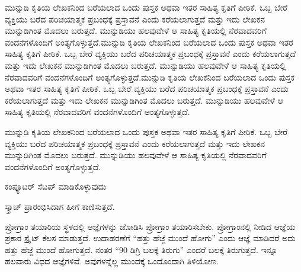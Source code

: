 \documentclass[16pt]{book}
\begin{document}
ಮುನ್ನುಡಿ ಕೃತಿಯ ಲೇಖಕನಿಂದ ಬರೆಯಲಾದ ಒಂದು ಪುಸ್ತಕ ಅಥವಾ ಇತರ ಸಾಹಿತ್ಯ ಕೃತಿಗೆ ಪೀಠಿಕೆ. ಒಬ್ಬ ಬೇರೆ ವ್ಯಕ್ತಿಯು ಬರೆದ ಪರಿಚಯಾತ್ಮಕ ಪ್ರಬಂಧಕ್ಕೆ ಪ್ರಸ್ತಾವನೆ ಎಂದು ಕರೆಯಲಾಗುತ್ತದೆ ಮತ್ತು ಇದು ಲೇಖಕನ ಮುನ್ನುಡಿಗಿಂತ ಮೊದಲು ಬರುತ್ತದೆ. ಮುನ್ನುಡಿಯು ಹಲವುವೇಳೆ ಆ ಸಾಹಿತ್ಯ ಕೃತಿಯಲ್ಲಿ ನೆರವಾದವರಿಗೆ ವಂದನೆಗಳೊಂದಿಗೆ ಅಂತ್ಯಗೊಳ್ಳುತ್ತದೆ.ಮುನ್ನುಡಿ ಕೃತಿಯ ಲೇಖಕನಿಂದ ಬರೆಯಲಾದ ಒಂದು ಪುಸ್ತಕ ಅಥವಾ ಇತರ ಸಾಹಿತ್ಯ ಕೃತಿಗೆ ಪೀಠಿಕೆ. ಒಬ್ಬ ಬೇರೆ ವ್ಯಕ್ತಿಯು ಬರೆದ ಪರಿಚಯಾತ್ಮಕ ಪ್ರಬಂಧಕ್ಕೆ ಪ್ರಸ್ತಾವನೆ ಎಂದು ಕರೆಯಲಾಗುತ್ತದೆ ಮತ್ತು ಇದು ಲೇಖಕನ ಮುನ್ನುಡಿಗಿಂತ ಮೊದಲು ಬರುತ್ತದೆ. ಮುನ್ನುಡಿಯು ಹಲವುವೇಳೆ ಆ ಸಾಹಿತ್ಯ ಕೃತಿಯಲ್ಲಿ ನೆರವಾದವರಿಗೆ ವಂದನೆಗಳೊಂದಿಗೆ ಅಂತ್ಯಗೊಳ್ಳುತ್ತದೆ.ಮುನ್ನುಡಿ ಕೃತಿಯ ಲೇಖಕನಿಂದ ಬರೆಯಲಾದ ಒಂದು ಪುಸ್ತಕ ಅಥವಾ ಇತರ ಸಾಹಿತ್ಯ ಕೃತಿಗೆ ಪೀಠಿಕೆ. ಒಬ್ಬ ಬೇರೆ ವ್ಯಕ್ತಿಯು ಬರೆದ ಪರಿಚಯಾತ್ಮಕ ಪ್ರಬಂಧಕ್ಕೆ ಪ್ರಸ್ತಾವನೆ ಎಂದು ಕರೆಯಲಾಗುತ್ತದೆ ಮತ್ತು ಇದು ಲೇಖಕನ ಮುನ್ನುಡಿಗಿಂತ ಮೊದಲು ಬರುತ್ತದೆ. ಮುನ್ನುಡಿಯು ಹಲವುವೇಳೆ ಆ ಸಾಹಿತ್ಯ ಕೃತಿಯಲ್ಲಿ ನೆರವಾದವರಿಗೆ ವಂದನೆಗಳೊಂದಿಗೆ ಅಂತ್ಯಗೊಳ್ಳುತ್ತದೆ.

\vspace{1cm}
ಮುನ್ನುಡಿ ಕೃತಿಯ ಲೇಖಕನಿಂದ ಬರೆಯಲಾದ ಒಂದು ಪುಸ್ತಕ ಅಥವಾ ಇತರ ಸಾಹಿತ್ಯ ಕೃತಿಗೆ ಪೀಠಿಕೆ. ಒಬ್ಬ ಬೇರೆ ವ್ಯಕ್ತಿಯು ಬರೆದ ಪರಿಚಯಾತ್ಮಕ ಪ್ರಬಂಧಕ್ಕೆ ಪ್ರಸ್ತಾವನೆ ಎಂದು ಕರೆಯಲಾಗುತ್ತದೆ ಮತ್ತು ಇದು ಲೇಖಕನ ಮುನ್ನುಡಿಗಿಂತ ಮೊದಲು ಬರುತ್ತದೆ. ಮುನ್ನುಡಿಯು ಹಲವುವೇಳೆ ಆ ಸಾಹಿತ್ಯ ಕೃತಿಯಲ್ಲಿ ನೆರವಾದವರಿಗೆ ವಂದನೆಗಳೊಂದಿಗೆ ಅಂತ್ಯಗೊಳ್ಳುತ್ತದೆ.
\tableofcontents

\newpage
\listoffigures

\newpage
\begin{center}
\Large{ಕಂಪ್ಯೂಟರ್ ಸೆಟಪ್ ಮಾಡಿಕೊಳ್ಳುವುದು}
\end{center}
\vspace{1cm}
ಸ್ಕ್ರಾಚ್ ಪ್ರಾರಂಭಿಸಿದಾಗ ಹೀಗೆ ಕಾಣಿಸುತ್ತದೆ. \par

ಪ್ರೋಗ್ರಾಂ ತಯಾರಿಯ ಸ್ಥಳದಲ್ಲಿ ಆಜ್ಞೆಗಳನ್ನು ಜೋಡಿಸಿ ಪ್ರೋಗ್ರಾಂ ತಯಾರಿಸಬೇಕು. ಪ್ರೋಗ್ರಾಂನಲ್ಲಿ ನೀಡಿದ ಆಜ್ಞೆಯ ಪ್ರಕಾರ ಸ್ಪ್ರೈಟ್ ಕೆಲಸ ಮಾಡುತ್ತದೆ. ಉದಾಹರಣೆಗೆ “ಹತ್ತು ಹೆಜ್ಜೆ ಮುಂದೆ ಹೋಗು” ಎಂದು ಆಜ್ಞೆ ಮಾಡಿದರೆ ಅದು ಹತ್ತು ಹೆಜ್ಜೆ ಮುಂದೆ ಹೋಗುತ್ತದೆ. ನಂತರ “90 ಡಿಗ್ರಿ ಬಲಕ್ಕೆ ತಿರುಗು” ಎಂದರೆ ಬಲಕ್ಕೆ ತಿರುಗುತ್ತದೆ. ಇನ್ನೂ ಹಲವಾರು ವಿಧದ ಆಜ್ಞೆಗಳಿವೆ. ಅವುಗಳನ್ನೆಲ್ಲ ಮುಂದಕ್ಕೆ ಒಂದೊಂದಾಗಿ ತಿಳಿಯೋಣ.
\vspace{1cm}
\end{document}
